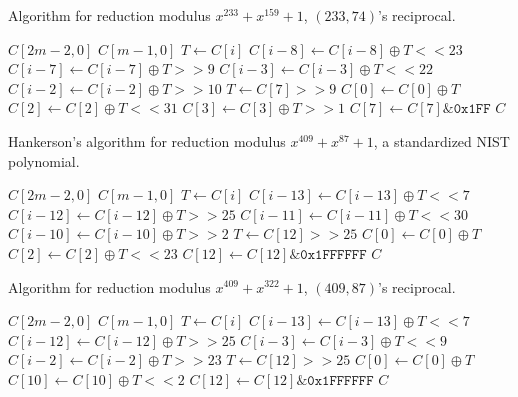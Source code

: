  \begin{algorithm}
  \caption{Algorithm for reduction modulus $x^{233} + x^{159} + 1$, $(233, 74)$'s reciprocal.}
  \label{alg:233_159}
 \begin{algorithmic}[1]
  \REQUIRE $C[2m-2,0]$
  \ENSURE $C[m-1,0]$
    \STATE $T \gets C[i]$
    \STATE $C[i-8] \gets C[i-8] \oplus T << 23$
    \STATE $C[i-7] \gets C[i-7] \oplus T >> 9$
    \STATE $C[i-3] \gets C[i-3] \oplus T << 22$
    \STATE $C[i-2] \gets C[i-2] \oplus T >> 10$
  \ENDFOR
  \STATE $T \gets C[7] >> 9$
  \STATE $C[0] \gets C[0] \oplus T$
  \STATE $C[2] \gets C[2] \oplus T << 31$
  \STATE $C[3] \gets C[3] \oplus T >> 1$
  \STATE $C[7] \gets C[7] \& \texttt{0x1FF}$
  \RETURN $C$
\end{algorithmic}
\end{algorithm}

\begin{algorithm}
  \caption{Hankerson's algorithm for reduction modulus $x^{409} + x^{87} + 1$, a standardized NIST polynomial.}
  \label{alg:409_87_nist}
\begin{algorithmic}[1]
  \REQUIRE $C[2m-2,0]$
  \ENSURE $C[m-1,0]$
    \STATE $T \gets C[i]$
    \STATE $C[i-13] \gets C[i-13] \oplus T << 7$
    \STATE $C[i-12] \gets C[i-12] \oplus T >> 25$
    \STATE $C[i-11] \gets C[i-11] \oplus T << 30$
    \STATE $C[i-10] \gets C[i-10] \oplus T >> 2$
  \ENDFOR
  \STATE $T \gets C[12] >> 25$
  \STATE $C[0] \gets C[0] \oplus T$
  \STATE $C[2] \gets C[2] \oplus T << 23$
  \STATE $C[12] \gets C[12] \& \texttt{0x1FFFFFF}$
  \RETURN $C$
\end{algorithmic}
\end{algorithm}


\begin{algorithm}
  \caption{Algorithm for reduction modulus $x^{409} + x^{322} + 1$, $(409, 87)$'s reciprocal.}
  \label{alg:409_322}
\begin{algorithmic}[1]
  \REQUIRE $C[2m-2,0]$
  \ENSURE $C[m-1,0]$
    \STATE $T \gets C[i]$
    \STATE $C[i-13] \gets C[i-13] \oplus T << 7$
    \STATE $C[i-12] \gets C[i-12] \oplus T >> 25$
    \STATE $C[i-3] \gets C[i-3] \oplus T << 9$
    \STATE $C[i-2] \gets C[i-2] \oplus T >> 23$
  \ENDFOR
  \STATE $T \gets C[12] >> 25$
  \STATE $C[0] \gets C[0] \oplus T$
  \STATE $C[10] \gets C[10] \oplus T << 2$
  \STATE $C[12] \gets C[12] \& \texttt{0x1FFFFFF}$
  \RETURN $C$
\end{algorithmic}
\end{algorithm}

